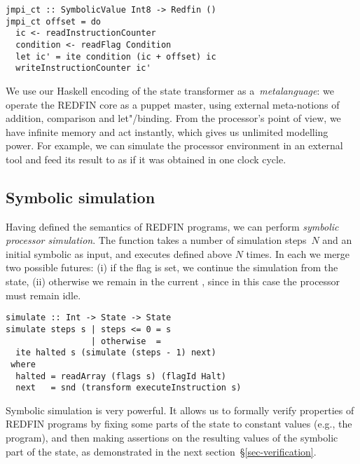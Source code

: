 \vspace{-0.5mm}
\begin{verbatim}
jmpi_ct :: SymbolicValue Int8 -> Redfin ()
jmpi_ct offset = do
  ic <- readInstructionCounter
  condition <- readFlag Condition
  let ic' = ite condition (ic + offset) ic
  writeInstructionCounter ic'
\end{verbatim}

\noindent
We use our Haskell encoding of the state transformer as a~\emph{metalanguage}:
we operate the REDFIN core as a puppet master, using external meta-notions of
addition, comparison and let"/binding. From the processor's
point of view, we have infinite memory and act instantly, which gives us unlimited
modelling power. For example, we can simulate the processor environment
in an external tool and feed its result to  as if it was
obtained in one clock cycle.

\vspace{-1mm}
\subsection{Symbolic simulation}
\vspace{-1mm}

Having defined the semantics of REDFIN programs, we can perform \emph{symbolic
processor simulation}. The function  takes a number of simulation
steps~$N$ and an initial symbolic  as input, and executes
 defined above $N$ times. In each  we
merge two possible futures: (i) if the  flag is set, we continue the
simulation from the  state, (ii) otherwise we remain in the current
, since in this case the processor must remain idle.

\begin{verbatim}
simulate :: Int -> State -> State
simulate steps s | steps <= 0 = s
                 | otherwise  =
  ite halted s (simulate (steps - 1) next)
 where
  halted = readArray (flags s) (flagId Halt)
  next   = snd (transform executeInstruction s)
\end{verbatim}

\noindent
Symbolic simulation is very powerful. It allows us to formally verify properties
of REDFIN programs by fixing some parts of the state to constant values (e.g.,
the program), and then making assertions on the resulting values of
the symbolic part of the state, as demonstrated in the next
section~\S\ref{sec-verification}.

